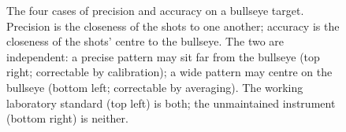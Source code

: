 \begin{figure}[htbp]
\begin{tikzpicture}[
  target/.style={draw=engblack, thick},
  shot/.style={fill=engred, draw=engred, circle, inner sep=0.8pt},
  panel/.style={font=\small\bfseries, anchor=south},
]
\end{tikzpicture}
\caption[Target diagram: precision and accuracy]{The four cases of
precision and accuracy on a bullseye target. Precision is the
closeness of the shots to one another; accuracy is the closeness of
the shots' centre to the bullseye. The two are independent: a
precise pattern may sit far from the bullseye (top right; correctable
by calibration); a wide pattern may centre on the bullseye (bottom
left; correctable by averaging). The working laboratory standard
(top left) is both; the unmaintained instrument (bottom right) is
neither.}
\label{fig:vol01:ch01:target}
\end{figure}
